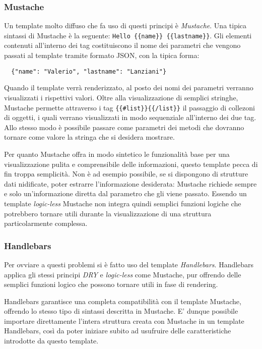 \subsubsection{Mustache} %
\label{ssub:mustache}
Un template molto diffuso che fa uso di questi principi è {\itshape Mustache}.
Una tipica sintassi di Mustache è la seguente: \lstinline!Hello {{name}} {{lastname}}!. Gli elementi contenuti all'interno dei tag {{}} costituiscono il nome dei parametri che vengono passati al template tramite formato JSON, con la tipica forma:
{\small
\begin{verbatim}
  {"name": "Valerio", "lastname": "Lanziani"}
\end{verbatim}
}
Quando il template verrà renderizzato, al posto dei nomi dei parametri verranno visualizzati i rispettivi valori. Oltre alla visualizzazione di semplici stringhe, Mustache permette attraverso i tag \lstinline!{{#list}}{{/list}}! il passaggio di collezoni di oggetti, i quali verrano visualizzati in modo sequenziale all'interno dei due tag. Allo stesso modo è possibile passare come parametri dei metodi che dovranno tornare come valore la stringa che si desidera mostrare.

Per quanto Mustache offra in modo sintetico le funzionalità base per una visualizzazione pulita e comprensibile delle informazioni, questo template pecca di fin troppa semplicità.
Non è ad esempio possibile, se si dispongono di strutture dati nidificate, poter estrarre l'informazione desiderata: Mustache richiede sempre e solo un'informazione diretta dal parametro che gli viene passato.
Essendo un template {\itshape logic-less} Mustache non integra quindi semplici funzioni logiche che potrebbero tornare utili durante la visualizzazione di una struttura particolarmente complessa.

\subsubsection{Handlebars} %
\label{ssub:handlebars}
Per ovviare a questi problemi si è fatto uso del template {\itshape Handlebars}.
Handlebars applica gli stessi principi {\itshape DRY} e {\itshape logic-less} come Mustache, pur offrendo delle semplici funzioni logico che possono tornare utili in fase di rendering.

Handlebars garantisce una completa compatibilità con il template Mustache, offrendo lo stesso tipo di sintassi descritta in Mustache. E' dunque possibile importare direttamente l'intera struttura creata con Mustache in un template Handlebars, così da poter iniziare subito ad usufruire delle caratteristiche introdotte da questo template.

